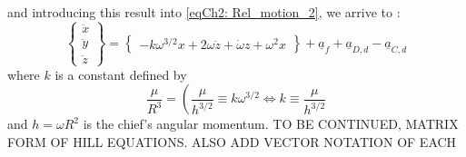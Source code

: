 	\noindent and introducing this result into \eqref{eqCh2: 	Rel_motion_2}, we arrive to \cite{Yamanaka_Ankersen}:
	\begin{equation}
	\left\{
	\begin{array}{c}
	\ddot{x}\\
	\ddot{y}\\
	\ddot{z}
	\end{array}\right\}
	= 
	\left\{
	\begin{array}{c}
	- k \omega^{3/2} x + 2\omega \dot{z} + \dot{\omega} z + \omega^2 x	
	\end{array}\right\}
	+ \underline{a}_f + \underline{a}_{D, d} - \underline{a}_{C, d}
	\label{eqCh2: Diff_eqs_prox}
	\end{equation}
	\noindent where $k$ is a constant defined by 
	\[
	\dfrac{\mu}{R^3} = \left(\dfrac{\mu }{h^{3/2}} \equiv k \omega^{3/2} \Leftrightarrow k \equiv \dfrac{\mu} {h^{3/2}}
	\]
	\indent and $h = \omega R^2$ is the chief's angular momentum. TO BE CONTINUED, MATRIX FORM OF HILL EQUATIONS. ALSO ADD VECTOR NOTATION OF EACH